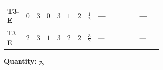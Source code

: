 \documentclass[8pt]{article}
\begin{document}
\begin{landscape}
\begin{longtable}{@{}llcccccc >{\raggedright\arraybackslash}p{0.21\linewidth} >{\raggedright\arraybackslash}p{0.21\linewidth} >{\raggedright\arraybackslash}p{0.21\linewidth}@{}}
\midrule
T3-E & $0$ & $3$ & $0$ & $3$ & $1$ & $2$ & $\frac{1}{2}$ & --- & \scriptsize\adjustbox{max width=\linewidth}{$\begin{gathered} +\frac{1}{4} (3 \left({y_1}\,\left({y_1}\right)^{\dagger}\,{y_2}\right)_{ij}+2 \left({Y_e}\,\left({Y_e}\right)^{\dagger}\,{y_2}\right)_{ij}+6 \left({y_2}\,\left({y_2}\right)^{\dagger}\,{y_2}\right)_{ij})\end{gathered}$} & --- \\
\midrule
T3-E & $2$ & $3$ & $1$ & $3$ & $2$ & $2$ & $\frac{3}{2}$ & --- & \scriptsize\adjustbox{max width=\linewidth}{$\begin{gathered} +\frac{1}{4} (3 \left({y_1}\,\left({y_1}\right)^{\dagger}\,{y_2}\right)_{ij}+2 \left({Y_e}\,\left({Y_e}\right)^{\dagger}\,{y_2}\right)_{ij}+6 \left({y_2}\,\left({y_2}\right)^{\dagger}\,{y_2}\right)_{ij})\end{gathered}$} & --- \\
\midrule
\bottomrule
\end{longtable}
\clearpage
\noindent\textbf{Quantity: }$y_2$\par\smallskip

\end{landscape}
\end{document}
